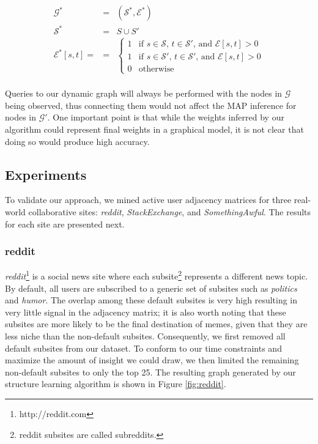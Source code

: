 \documentclass{article} %
\begin{document}
$$
\begin{array}{lll}
\mathcal{G}^* &=& (\mathcal{S}^*,\mathcal{E}^*)\\
\mathcal{S}^* &=& S \cup S'\\
\mathcal{E}^*[s,t] = &=& \begin{cases}1 & \text{if } s \in \mathcal{S}\text{, }t \in \mathcal{S'} \text{, and } \mathcal{E}[s,t] > 0\\
                                      1 & \text{if } s \in \mathcal{S'}\text{, }t \in \mathcal{S'} \text{, and } \mathcal{E}[s,t] > 0\\
                                      0 & \text{otherwise}\end{cases}\\
\end{array}
$$

Queries to our dynamic graph will always be performed with the nodes in $\mathcal{G}$ being observed, thus connecting them would not affect the MAP inference for nodes in $\mathcal{G'}$. One important point is that while the weights inferred by our algorithm could represent final weights in a graphical model, it is not clear that doing so would produce high accuracy.

\subsection{Experiments}
To validate our approach, we mined active user adjacency matrices for three real-world collaborative sites: \textit{reddit}, \textit{StackExchange}, and \textit{SomethingAwful}. The results for each site are presented next.

\subsubsection{reddit}
\textit{reddit}\footnote{http://reddit.com} is a social news site where each subsite\footnote{reddit subsites are called subreddits.} represents a different news topic. By default, all users are subscribed to a generic set of subsites such as \textit{politics} and \textit{humor}. The overlap among these default subsites is very high resulting in very little signal in the adjacency matrix; it is also worth noting that these subsites are more likely to be the final destination of memes, given that they are less niche than the non-default subsites. Consequently, we first removed all default subsites from our dataset. To conform to our time constraints and maximize the amount of insight we could draw, we then limited the remaining non-default subsites to only the top 25. The resulting graph generated by our structure learning algorithm is shown in Figure \ref{fig:reddit}.
\end{document}

